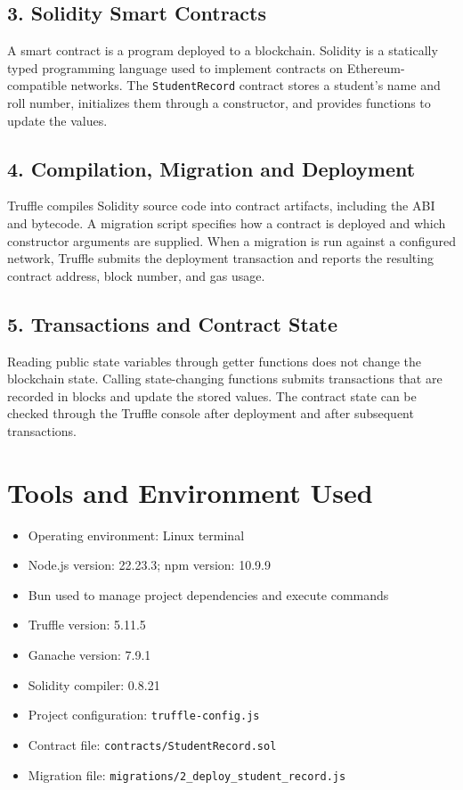 \documentclass[12pt,a4paper]{article}
\begin{document}
\subsection{3. Solidity Smart Contracts}
A smart contract is a program deployed to a blockchain. Solidity is a statically typed programming language used to implement contracts on Ethereum-compatible networks. The \texttt{StudentRecord} contract stores a student's name and roll number, initializes them through a constructor, and provides functions to update the values.

\subsection{4. Compilation, Migration and Deployment}
Truffle compiles Solidity source code into contract artifacts, including the ABI and bytecode. A migration script specifies how a contract is deployed and which constructor arguments are supplied. When a migration is run against a configured network, Truffle submits the deployment transaction and reports the resulting contract address, block number, and gas usage.

\subsection{5. Transactions and Contract State}
Reading public state variables through getter functions does not change the blockchain state. Calling state-changing functions submits transactions that are recorded in blocks and update the stored values. The contract state can be checked through the Truffle console after deployment and after subsequent transactions.

\section{Tools and Environment Used}
\begin{itemize}[itemsep=2pt]
    \item Operating environment: Linux terminal
    \item Node.js version: 22.23.3; npm version: 10.9.9
    \item Bun used to manage project dependencies and execute commands
    \item Truffle version: 5.11.5
    \item Ganache version: 7.9.1
    \item Solidity compiler: 0.8.21
    \item Project configuration: \texttt{truffle-config.js}
    \item Contract file: \texttt{contracts/StudentRecord.sol}
    \item Migration file: \texttt{migrations/2\_deploy\_student\_record.js}
\end{itemize}
\end{document}
